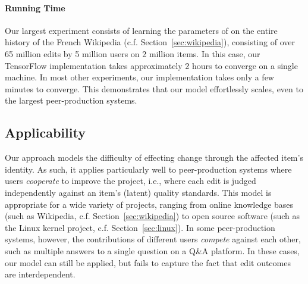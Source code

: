 \paragraph{Running Time}
Our largest experiment consists of learning the parameters of  on the entire history of the French Wikipedia (c.f. Section~\ref{sec:wikipedia}), consisting of over \num{65} million edits by \num{5} million users on \num{2} million items.
In this case, our TensorFlow implementation takes approximately \num{2} hours to converge on a single machine.
In most other experiments, our implementation takes only a few minutes to converge.
This demonstrates that our model effortlessly scales, even to the largest peer-production systems.

\subsection{Applicability}
Our approach models the difficulty of effecting change through the affected item's identity.
As such, it applies particularly well to peer-production systems where users \emph{cooperate} to improve the project, i.e., where each edit is judged independently against an item's (latent) quality standards.
This model is appropriate for a wide variety of projects, ranging from online knowledge bases (such as Wikipedia, c.f. Section~\ref{sec:wikipedia}) to open source software (such as the Linux kernel project, c.f. Section~\ref{sec:linux}).
In some peer-production systems, however, the contributions of different users \emph{compete} against each other, such as multiple answers to a single question on a Q\&A platform.
In these cases, our model can still be applied, but fails to capture the fact that edit outcomes are interdependent.
